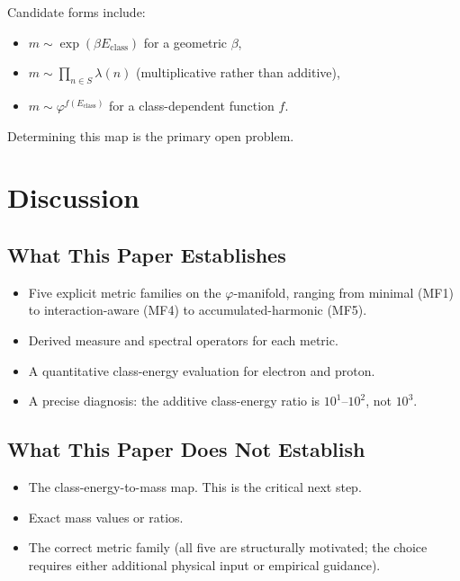 \documentclass[12pt]{article}
\newcommand{\phig}{\varphi}
\begin{document}
Candidate forms include:
\begin{itemize}
    \item $m \sim \exp(\beta E_{\mathrm{class}})$ for a geometric $\beta$,
    \item $m \sim \prod_{n \in S} \lambda(n)$ (multiplicative rather than additive),
    \item $m \sim \phig^{f(E_{\mathrm{class}})}$ for a class-dependent function $f$.
\end{itemize}

Determining this map is the primary open problem.

\section{Discussion}\label{sec:discussion}

\subsection{What This Paper Establishes}

\begin{itemize}
    \item Five explicit metric families on the $\phig$-manifold, ranging from minimal (MF1) to interaction-aware (MF4) to accumulated-harmonic (MF5).
    \item Derived measure and spectral operators for each metric.
    \item A quantitative class-energy evaluation for electron and proton.
    \item A precise diagnosis: the additive class-energy ratio is $10^1$--$10^2$, not $10^3$.
\end{itemize}

\subsection{What This Paper Does Not Establish}

\begin{itemize}
    \item The class-energy-to-mass map. This is the critical next step.
    \item Exact mass values or ratios.
    \item The correct metric family (all five are structurally motivated; the choice requires either additional physical input or empirical guidance).
\end{itemize}
\end{document}
